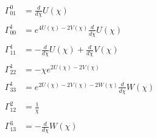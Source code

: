 \begin{align*}
\Gamma^{0}_{01} &= \frac{d}{d \chi} U{\left(\chi \right)} \\\\
\Gamma^{1}_{00} &= e^{4 U{\left(\chi \right)} - 2 V{\left(\chi \right)}} \frac{d}{d \chi} U{\left(\chi \right)} \\\\
\Gamma^{1}_{11} &= - \frac{d}{d \chi} U{\left(\chi \right)} + \frac{d}{d \chi} V{\left(\chi \right)} \\\\
\Gamma^{1}_{22} &= - \chi e^{2 U{\left(\chi \right)} - 2 V{\left(\chi \right)}} \\\\
\Gamma^{1}_{33} &= e^{2 U{\left(\chi \right)} - 2 V{\left(\chi \right)} - 2 W{\left(\chi \right)}} \frac{d}{d \chi} W{\left(\chi \right)} \\\\
\Gamma^{2}_{12} &= \frac{1}{\chi} \\\\
\Gamma^{3}_{13} &= - \frac{d}{d \chi} W{\left(\chi \right)} \\\\
\end{align*}
